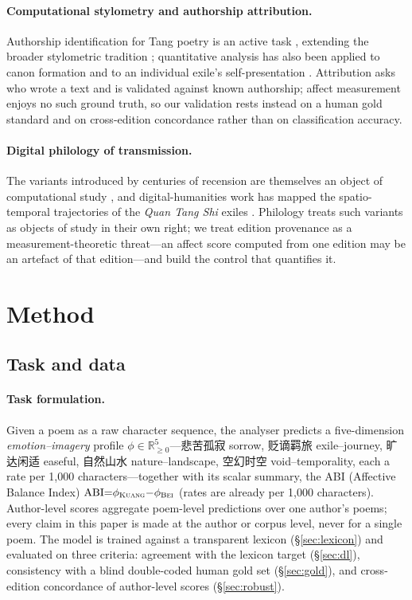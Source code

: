 \documentclass[10pt]{article}
\begin{document}
\paragraph{Computational stylometry and authorship attribution.} Authorship
identification for Tang poetry is an active task \citep{shiziren2022,zhou2021lda},
extending the broader stylometric tradition \citep{stamatatos2009survey};
quantitative analysis has also been applied to canon formation
\citep{wang2008finding} and to an individual exile's self-presentation
\citep{wang2023lideyu}. Attribution asks who wrote a text and is validated against
known authorship; affect measurement enjoys no such ground truth, so our validation
rests instead on a human gold standard and on cross-edition concordance rather than
on classification accuracy.

\paragraph{Digital philology of transmission.} The variants introduced by centuries
of recension are themselves an object of computational study \citep{yuan2023variants},
and digital-humanities work has mapped the spatio-temporal trajectories of the
\emph{Quan Tang Shi} exiles \citep{bianzhe2022}. Philology treats such variants as
objects of study in their own right; we treat edition provenance as a
measurement-theoretic threat---an affect score computed from one edition may be an
artefact of that edition---and build the control that quantifies it.

\section{Method}
\label{sec:method}
\subsection{Task and data}
\label{sec:data}
\paragraph{Task formulation.} Given a poem as a raw character sequence, the
analyser predicts a five-dimension \emph{emotion--imagery} profile
$\phi\in\mathbb{R}_{\ge0}^{5}$---悲苦孤寂 sorrow, 贬谪羁旅 exile--journey, 旷达闲适
easeful, 自然山水 nature--landscape, 空幻时空 void--temporality, each a rate per
1{,}000 characters---together with its scalar summary, the ABI (Affective Balance Index)
$\mathrm{ABI}{=}\phi_{\textsc{Kuang}}{-}\phi_{\textsc{Bei}}$ (rates are already per 1{,}000 characters). Author-level
scores aggregate poem-level predictions over one author's poems; every claim in
this paper is made at the author or corpus level, never for a single poem. The
model is trained against a transparent lexicon (\S\ref{sec:lexicon}) and evaluated
on three criteria: agreement with the lexicon target (\S\ref{sec:dl}), consistency
with a blind double-coded human gold set (\S\ref{sec:gold}), and cross-edition
concordance of author-level scores (\S\ref{sec:robust}).
\end{document}
